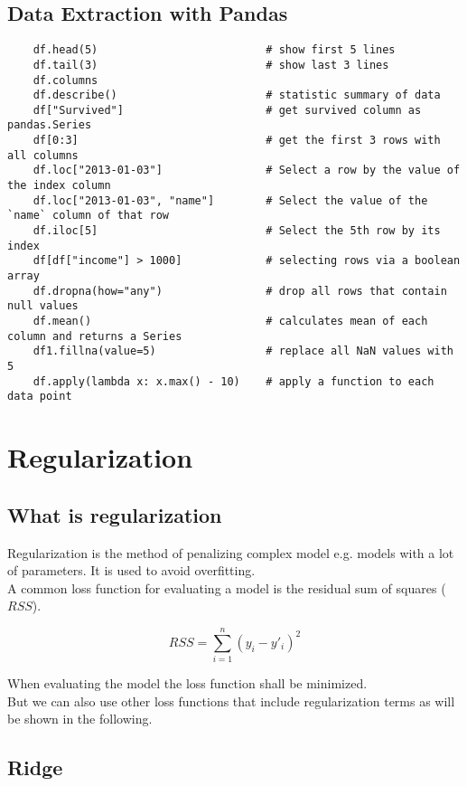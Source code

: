 \subsection{Data Extraction with Pandas}

\begin{lstlisting}
    df.head(5)                          # show first 5 lines
    df.tail(3)                          # show last 3 lines
    df.columns              
    df.describe()                       # statistic summary of data
    df["Survived"]                      # get survived column as pandas.Series
    df[0:3]                             # get the first 3 rows with all columns
    df.loc["2013-01-03"]                # Select a row by the value of the index column
    df.loc["2013-01-03", "name"]        # Select the value of the `name` column of that row
    df.iloc[5]                          # Select the 5th row by its index
    df[df["income"] > 1000]             # selecting rows via a boolean array
    df.dropna(how="any")                # drop all rows that contain null values
    df.mean()                           # calculates mean of each column and returns a Series
    df1.fillna(value=5)                 # replace all NaN values with 5
    df.apply(lambda x: x.max() - 10)    # apply a function to each data point
\end{lstlisting}


\section{Regularization}

\subsection{What is regularization}
Regularization is the method of penalizing complex model e.g. models with a lot of parameters. It is used to avoid overfitting.\\

A common loss function for evaluating a model is the residual sum of squares ($RSS$).

$$
    RSS = \sum_{i=1}^{n} (y_{i} - y'_{i})^{2}
$$

When evaluating the model the loss function shall be minimized.\\
But we can also use other loss functions that include regularization terms as will be shown in the following.

\subsection{Ridge}

